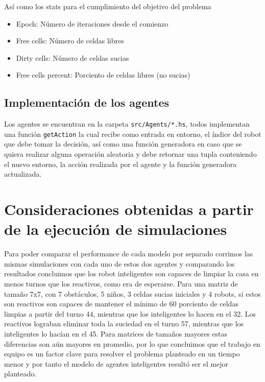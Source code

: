 \documentclass[]{article}
\begin{document}
\begin{flushleft}
	Así como los stats para el cumplimiento del objetivo del problema
\end{flushleft}

\begin{itemize}
	\item Epoch: Número de iteraciones desde el comienzo
	\item Free cells: Número de celdas libres
	\item Dirty cells: Número de celdas sucias
	\item Free cells percent: Porciento de celdas libres (no sucias)
\end{itemize}

\subsection{Implementación de los agentes}

\begin{flushleft}
	Los agentes se encuentran en la carpeta \verb*|src/Agents/*.hs|, todos implementan una función \verb*|getAction| la cual recibe como entrada en entorno, el índice del robot que debe tomar la decisión, así como una función generadora en caso que se quiera realizar alguna operación aleatoria y debe retornar una tupla conteniendo el nuevo entorno, la acción realizada por el agente y la función generadora actualizada.
\end{flushleft}

\section{Consideraciones obtenidas a partir de la ejecución de simulaciones}

\begin{flushleft}
	Para poder comparar el performance de cada modelo por separado corrimos las mismas simulaciones con cada uno de estos dos agentes y comparando los resultados concluimos que los robot inteligentes son capaces de limpiar la casa en menos turnos que los reactivos, como era de esperarse. Para una matriz de tamaño 7x7, con 7 obstáculos, 5 niños, 3 celdas sucias iniciales y 4 robots, si estos son reactivos son capaces de mantener el mínimo de 60 porciento de celdas limpias a partir del turno 44, mientras que los inteligentes lo hacen en el 32. Los reactivos lograban eliminar toda la suciedad en el turno 57, mientras que los inteligentes lo hacían en el 45. Para matrices de tamaños mayores estas diferencias son aún mayores en promedio, por lo que concluimos que el trabajo en equipo es un factor clave para resolver el problema planteado en un tiempo menor y por tanto el modelo de agentes inteligentes resultó ser el mejor planteado.
\end{flushleft}
\end{document}
